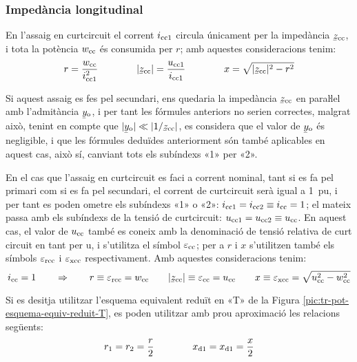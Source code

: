 \subsubsection{Impedància longitudinal}

En l'assaig en curtcircuit el corrent $i_\mathrm{cc1}$ circula
únicament per la impedància $\cmplx{z}\ped{cc}$, i tota la potència
$w_\mathrm{cc}$ és consumida per $r$; amb aquestes consideracions tenim:
\begin{equation}
    r = \frac{w\ped{cc}}{i\ped{cc1}^2} \qquad\qquad
    |\cmplx{z}\ped{cc}| = \frac{u\ped{cc1}}{i\ped{cc1}} \qquad\qquad
    x = \sqrt{|\cmplx{z}\ped{cc}|^2 - r^2}
\end{equation}

Si aquest assaig es fes pel secundari, ens quedaria la impedància
$\cmplx{z}\ped{cc}$ en paraŀlel amb l'admitància
$\cmplx{y}\ped{o}$, i per tant les fórmules anteriors no serien
correctes, malgrat això, tenint en compte que $|\cmplx{y}\ped{o}| \ll
|1/\cmplx{z}\ped{cc}|$, es considera que el valor de
$\cmplx{y}\ped{o}$ és negligible, i que les fórmules deduïdes
anteriorment són també aplicables en aquest cas, això sí, canviant
tots els subíndexs «1» per «2».

En el cas que l'assaig en curtcircuit es faci a corrent nominal,
tant  si es fa pel primari  com si es fa pel secundari, el corrent
de curtcircuit serà igual a \SI{1}{pu}, i per tant es poden ometre els
subíndexs «1» o «2»: $i_\mathrm{cc1} = i_\mathrm{cc2} \equiv i_\mathrm{cc} = 1$;
el mateix passa amb els subíndexs de la tensió de curtcircuit:
$u_\mathrm{cc1} = u_\mathrm{cc2} \equiv u_\mathrm{cc}$. En aquest cas, el valor
de $u_\mathrm{cc}$ també es coneix amb la denominació de
tensió relativa de curt  circuit en tant per u, i s'utilitza  el
símbol $\varepsilon_\mathrm{cc}$; per a $r$ i $x$ s'utilitzen també els
símbols $\varepsilon_\mathrm{rcc}$ i $\varepsilon_\mathrm{xcc}$
respectivament. Amb aquestes consideracions tenim:
\begin{equation}
    i\ped{cc} = 1 \qquad \Rightarrow \qquad r \equiv \varepsilon\ped{rcc} = w\ped{cc} \qquad
    |\cmplx{z}\ped{cc}| \equiv \varepsilon\ped{cc} = u\ped{cc} \qquad
    x \equiv \varepsilon\ped{xcc} = \sqrt{u\ped{cc}^2 - w\ped{cc}^2}
    \label{eq:assaig-cc-nomianl}
\end{equation}

Si es desitja utilitzar l'esquema equivalent reduït en «T» de la Figura \vref{pic:tr-pot-esquema-equiv-reduit-T}, es poden utilitzar amb prou aproximació les relacions següents:
\begin{equation}
    r_1 = r_2 = \frac{r}{2} \qquad\qquad x_\mathrm{d1} = x_\mathrm{d1} = \frac{x}{2}
\end{equation}


